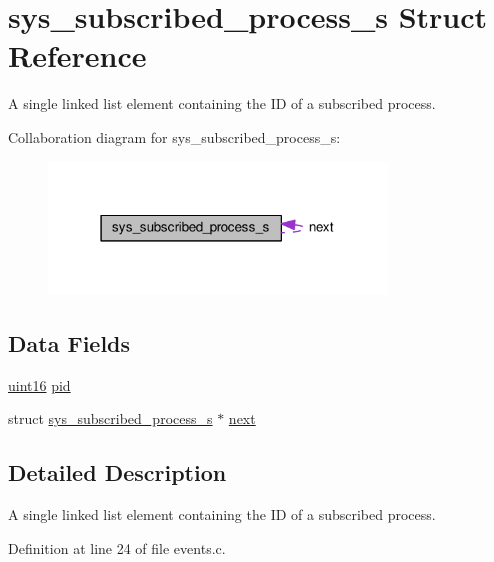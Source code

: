 \hypertarget{structsys__subscribed__process__s}{}\section{sys\+\_\+subscribed\+\_\+process\+\_\+s Struct Reference}
\label{structsys__subscribed__process__s}


A single linked list element containing the I\+D of a subscribed process.  




Collaboration diagram for sys\+\_\+subscribed\+\_\+process\+\_\+s\+:\nopagebreak
\begin{figure}[H]
\begin{center}
\leavevmode
\includegraphics[width=255pt]{d8/d74/structsys__subscribed__process__s__coll__graph}
\end{center}
\end{figure}
\subsection*{Data Fields}
\begin{DoxyCompactItemize}
\item 
\hyperlink{definitions_8h_a05f6b0ae8f6a6e135b0e290c25fe0e4e}{uint16} \hyperlink{structsys__subscribed__process__s_a94e62af7fee25e53ea6c81cbb311783d}{pid}
\item 
struct \hyperlink{structsys__subscribed__process__s}{sys\+\_\+subscribed\+\_\+process\+\_\+s} $\ast$ \hyperlink{structsys__subscribed__process__s_abcf0ef070dc4fd0ba7165dfae52d7316}{next}
\end{DoxyCompactItemize}


\subsection{Detailed Description}
A single linked list element containing the I\+D of a subscribed process. 

Definition at line 24 of file events.\+c.



